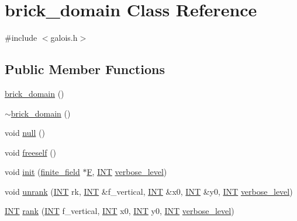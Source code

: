 \hypertarget{classbrick__domain}{}\section{brick\+\_\+domain Class Reference}
\label{classbrick__domain}


{\ttfamily \#include $<$galois.\+h$>$}

\subsection*{Public Member Functions}
\begin{DoxyCompactItemize}
\item 
\mbox{\hyperlink{classbrick__domain_ac26a11b2d605af091fe49ade4aea2c8e}{brick\+\_\+domain}} ()
\item 
\mbox{\hyperlink{classbrick__domain_a27d9e7a77c9a49ea05c45911140fad63}{$\sim$brick\+\_\+domain}} ()
\item 
void \mbox{\hyperlink{classbrick__domain_a77eece31b4943fe375c33a5891e73b7d}{null}} ()
\item 
void \mbox{\hyperlink{classbrick__domain_ae3198ccaf58d0db3a772cc427c31b278}{freeself}} ()
\item 
void \mbox{\hyperlink{classbrick__domain_a1370c85e19e7da6bcb86e66184999c4a}{init}} (\mbox{\hyperlink{classfinite__field}{finite\+\_\+field}} $\ast$\mbox{\hyperlink{classbrick__domain_afb4bb92545a6283dc398759f273dc889}{F}}, \mbox{\hyperlink{galois_8h_a09fddde158a3a20bd2dcadb609de11dc}{I\+NT}} \mbox{\hyperlink{simeon_8_c_a818073fbcc2f439e7c56952f67386122}{verbose\+\_\+level}})
\item 
void \mbox{\hyperlink{classbrick__domain_ae77f9055d5c6100c195867679603a3c2}{unrank}} (\mbox{\hyperlink{galois_8h_a09fddde158a3a20bd2dcadb609de11dc}{I\+NT}} rk, \mbox{\hyperlink{galois_8h_a09fddde158a3a20bd2dcadb609de11dc}{I\+NT}} \&f\+\_\+vertical, \mbox{\hyperlink{galois_8h_a09fddde158a3a20bd2dcadb609de11dc}{I\+NT}} \&x0, \mbox{\hyperlink{galois_8h_a09fddde158a3a20bd2dcadb609de11dc}{I\+NT}} \&y0, \mbox{\hyperlink{galois_8h_a09fddde158a3a20bd2dcadb609de11dc}{I\+NT}} \mbox{\hyperlink{simeon_8_c_a818073fbcc2f439e7c56952f67386122}{verbose\+\_\+level}})
\item 
\mbox{\hyperlink{galois_8h_a09fddde158a3a20bd2dcadb609de11dc}{I\+NT}} \mbox{\hyperlink{classbrick__domain_a7440294de06f007746a67e57a529e4fc}{rank}} (\mbox{\hyperlink{galois_8h_a09fddde158a3a20bd2dcadb609de11dc}{I\+NT}} f\+\_\+vertical, \mbox{\hyperlink{galois_8h_a09fddde158a3a20bd2dcadb609de11dc}{I\+NT}} x0, \mbox{\hyperlink{galois_8h_a09fddde158a3a20bd2dcadb609de11dc}{I\+NT}} y0, \mbox{\hyperlink{galois_8h_a09fddde158a3a20bd2dcadb609de11dc}{I\+NT}} \mbox{\hyperlink{simeon_8_c_a818073fbcc2f439e7c56952f67386122}{verbose\+\_\+level}})

\end{DoxyCompactItemize}
